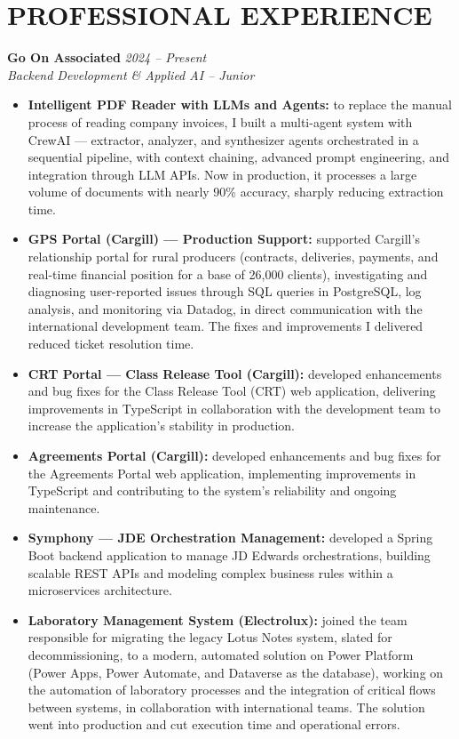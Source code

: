 \documentclass[11pt,a4paper]{article}
\begin{document}
\section{PROFESSIONAL EXPERIENCE}
\noindent
\textbf{Go On Associated} \hfill \textit{2024 -- Present} \\
\textit{Backend Development \& Applied AI -- Junior}
\begin{itemize}
    \item \textbf{Intelligent PDF Reader with LLMs and Agents:} to replace the manual process of reading company invoices, I built a multi-agent system with CrewAI --- extractor, analyzer, and synthesizer agents orchestrated in a sequential pipeline, with context chaining, advanced prompt engineering, and integration through LLM APIs. Now in production, it processes a large volume of documents with nearly 90\% accuracy, sharply reducing extraction time.
    \item \textbf{GPS Portal (Cargill) --- Production Support:} supported Cargill's relationship portal for rural producers (contracts, deliveries, payments, and real-time financial position for a base of 26,000 clients), investigating and diagnosing user-reported issues through SQL queries in PostgreSQL, log analysis, and monitoring via Datadog, in direct communication with the international development team. The fixes and improvements I delivered reduced ticket resolution time.
    \item \textbf{CRT Portal --- Class Release Tool (Cargill):} developed enhancements and bug fixes for the Class Release Tool (CRT) web application, delivering improvements in TypeScript in collaboration with the development team to increase the application's stability in production.
    \item \textbf{Agreements Portal (Cargill):} developed enhancements and bug fixes for the Agreements Portal web application, implementing improvements in TypeScript and contributing to the system's reliability and ongoing maintenance.
    \item \textbf{Symphony --- JDE Orchestration Management:} developed a Spring Boot backend application to manage JD Edwards orchestrations, building scalable REST APIs and modeling complex business rules within a microservices architecture.
    \item \textbf{Laboratory Management System (Electrolux):} joined the team responsible for migrating the legacy Lotus Notes system, slated for decommissioning, to a modern, automated solution on Power Platform (Power Apps, Power Automate, and Dataverse as the database), working on the automation of laboratory processes and the integration of critical flows between systems, in collaboration with international teams. The solution went into production and cut execution time and operational errors.
\end{itemize}
\vspace{8pt}
\end{document}

